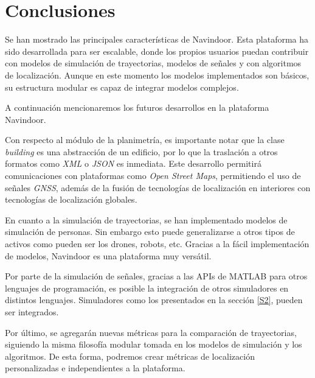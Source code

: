 \chapter{Conclusiones}\label{S5}

Se han mostrado las principales características de Navindoor.  Esta plataforma ha sido desarrollada para ser escalable, donde los propios usuarios puedan contribuir con modelos de simulación de trayectorias, modelos de señales y con algoritmos de localización. Aunque en este momento los modelos implementados son básicos, su estructura modular es capaz de integrar modelos complejos.
%  

A continuación mencionaremos los futuros desarrollos en la plataforma Navindoor.

Con respecto al módulo de la planimetría, es importante notar que la clase \emph{building} es una abstracción de un edificio, por lo que la traslación a otros formatos como \emph{XML} o \emph{JSON} es inmediata. Este desarrollo permitirá comunicaciones con plataformas como \emph{Open Street Maps}, permitiendo el uso de señales \emph{GNSS}, además de la fusión de tecnologías de localización en interiores con tecnologías de localización globales.
%

En cuanto a la simulación de trayectorias, se han implementado modelos de simulación de personas. Sin embargo esto puede generalizarse a otros tipos de activos como pueden ser los drones, robots, etc. Gracias a la fácil implementación de modelos, Navindoor es una plataforma muy versátil.

Por parte de la simulación de señales, gracias a las APIs de MATLAB para otros lenguajes de programación, es posible la integración de otros simuladores en distintos lenguajes. Simuladores como los presentados en la sección \ref{S2}, pueden ser integrados.

% 
Por último, se agregarán nuevas métricas para la comparación de trayectorias, siguiendo la misma filosofía modular tomada en los modelos de simulación y los algoritmos. De esta forma, podremos crear métricas de localización personalizadas e independientes a la plataforma.

% 
